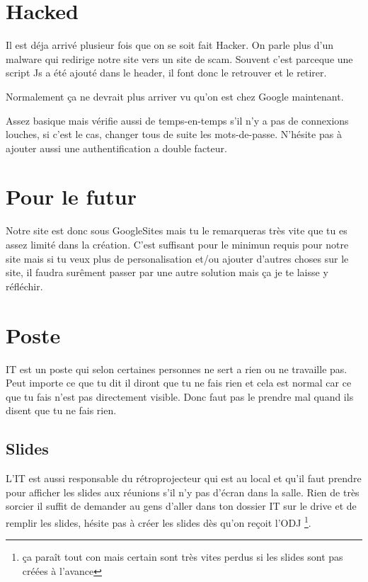 \documentclass[12pt]{article}
\begin{document}
\section{Hacked}	
	Il est déja arrivé plusieur fois que on se soit fait Hacker. On parle plus d'un malware qui redirige notre site vers un site de scam. Souvent c'est parceque une script Js a été ajouté dans le header, il font donc le retrouver et le retirer.

	Normalement ça ne devrait plus arriver vu qu'on est chez Google maintenant.
	
	Assez basique mais vérifie aussi de temps-en-temps s'il n'y a pas de connexions louches, si c'est le cas, changer tous de suite les mots-de-passe. N'hésite pas à ajouter aussi une authentification a double facteur.
	
\section{Pour le futur}
	Notre site est donc sous GoogleSites mais tu le remarqueras très vite que tu es assez limité dans la création. C'est suffisant pour le minimun requis pour notre site mais si tu veux plus de personalisation et/ou ajouter d'autres choses sur le site, il faudra surêment passer par une autre solution mais ça je te laisse y réfléchir.

\section{Poste}

	IT est un poste qui selon certaines personnes ne sert a rien ou ne travaille pas. Peut importe ce que tu dit il diront que tu ne fais rien et cela est normal car ce que tu fais n'est pas directement visible.
	Donc faut pas le prendre mal quand ils disent que tu ne fais rien.
	\subsection{Slides}	
	L'IT est aussi responsable du rétroprojecteur qui est au local et qu'il faut prendre pour afficher les slides aux réunions s'il n'y pas d'écran dans la salle. Rien de très sorcier il suffit de demander au gens d'aller dans ton dossier IT sur le drive et de remplir les slides, hésite pas à créer les slides dès qu'on reçoit l'ODJ \footnote{ça paraît tout con mais certain sont très vites perdus si les slides sont pas créées à l'avance}.
	
\end{document}
